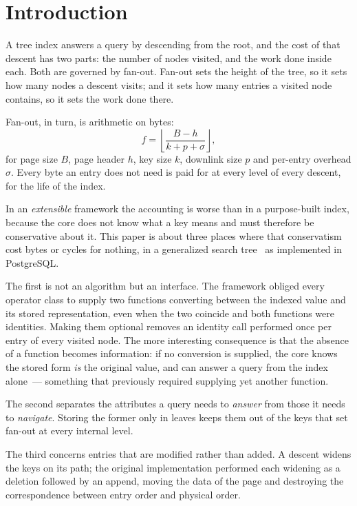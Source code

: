 \section{Introduction}

A tree index answers a query by descending from the root, and the cost of that
descent has two parts: the number of nodes visited, and the work done inside
each. Both are governed by fan-out. Fan-out sets the height of the tree, so it
sets how many nodes a descent visits; and it sets how many entries a visited node
contains, so it sets the work done there.

Fan-out, in turn, is arithmetic on bytes:
%
\begin{equation}
\label{eq:fanout}
f = \left\lfloor \frac{B - h}{k + p + \sigma} \right\rfloor ,
\end{equation}
%
for page size $B$, page header $h$, key size $k$, downlink size $p$ and
per-entry overhead $\sigma$. Every byte an entry does not need is paid for at
every level of every descent, for the life of the index.

In an \emph{extensible} framework the accounting is worse than in a
purpose-built index, because the core does not know what a key means and must
therefore be conservative about it. This paper is about three places where that
conservatism cost bytes or cycles for nothing, in a generalized search
tree~\cite{hellerstein1995generalized} as implemented in PostgreSQL.

The first is not an algorithm but an interface. The framework obliged every
operator class to supply two functions converting between the indexed value and
its stored representation, even when the two coincide and both functions were
identities. Making them optional removes an identity call performed once per
entry of every visited node. The more interesting consequence is that the
absence of a function becomes information: if no conversion is supplied, the core
knows the stored form \emph{is} the original value, and can answer a query from
the index alone~--- something that previously required supplying yet another
function.

The second separates the attributes a query needs to \emph{answer} from those it
needs to \emph{navigate}. Storing the former only in leaves keeps them out of the
keys that set fan-out at every internal level.

The third concerns entries that are modified rather than added. A descent widens
the keys on its path; the original implementation performed each widening as a
deletion followed by an append, moving the data of the page and destroying the
correspondence between entry order and physical order.

